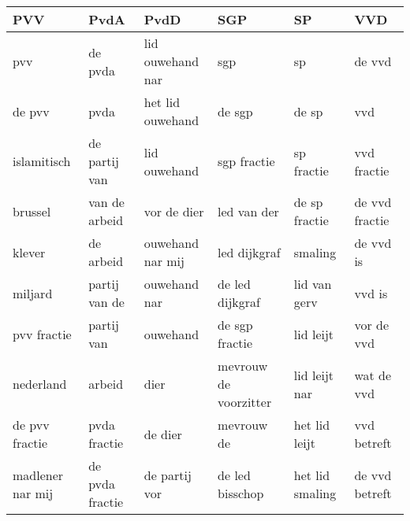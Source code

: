 \begin{tabular}{llllll}
\toprule
              PVV &             PvdA &              PvdD &                    SGP &               SP &             VVD \\
\midrule
              pvv &          de pvda &  lid ouwehand nar &                    sgp &               sp &          de vvd \\
           de pvv &             pvda &  het lid ouwehand &                 de sgp &            de sp &             vvd \\
      islamitisch &    de partij van &      lid ouwehand &            sgp fractie &       sp fractie &     vvd fractie \\
          brussel &    van de arbeid &       vor de dier &            led van der &    de sp fractie &  de vvd fractie \\
           klever &        de arbeid &  ouwehand nar mij &           led dijkgraf &          smaling &       de vvd is \\
          miljard &    partij van de &      ouwehand nar &        de led dijkgraf &     lid van gerv &          vvd is \\
      pvv fractie &       partij van &          ouwehand &         de sgp fractie &        lid leijt &      vor de vvd \\
        nederland &           arbeid &              dier &  mevrouw de voorzitter &    lid leijt nar &      wat de vvd \\
   de pvv fractie &     pvda fractie &           de dier &             mevrouw de &    het lid leijt &     vvd betreft \\
 madlener nar mij &  de pvda fractie &     de partij vor &        de led bisschop &  het lid smaling &  de vvd betreft \\
\bottomrule
\end{tabular}
